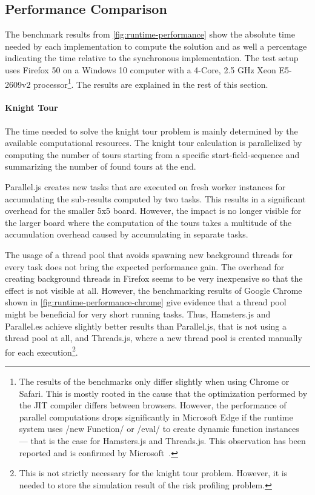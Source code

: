 \subsection{Performance Comparison}
The benchmark results from \cref{fig:runtime-performance} show the absolute time needed by each implementation to compute the solution and as well a percentage indicating the time relative to the synchronous implementation. The test setup uses Firefox 50 on a Windows 10 computer with a 4-Core, 2.5 GHz Xeon E5-2609v2 processor\footnote{The results of the benchmarks only differ slightly when using Chrome or Safari. This is mostly rooted in the cause that the optimization performed by the JIT compiler differs between browsers. However, the performance of parallel computations drops significantly in Microsoft Edge if the runtime system uses \javascriptinline/new Function/ or \javascriptinline/eval/ to create dynamic function instances --- that is the case for Hamsters.js and Threads.js. This observation has been reported and is confirmed by Microsoft~\cite{newFunctionWebWorkerEdge}.}. The results are explained in the rest of this section.

\begin{figure*}
		
	\caption{Runtime Performance of Parallelization Problems Relative to Synchronously Execution}
	\label{fig:runtime-performance}
\end{figure*}


\paragraph{Knight Tour} The time needed to solve the knight tour problem is mainly determined by the available computational resources. The knight tour calculation is parallelized by computing the number of tours starting from a specific start-field-sequence and summarizing the  number of found tours at the end. 

Parallel.js creates new tasks that are executed on fresh worker instances for accumulating the sub-results computed by two tasks. This results in a significant overhead for the smaller 5x5 board. However, the impact is no longer visible for the larger board where the computation of the tours takes a multitude of the accumulation overhead caused by accumulating in separate tasks.

The usage of a thread pool that avoids spawning new background threads for every task does not bring the expected performance gain. The overhead for creating background threads in Firefox seems to be very inexpensive so that the effect is not visible at all. However, the benchmarking results of Google Chrome shown in \cref{fig:runtime-performance-chrome} give evidence that a thread pool might be beneficial for very short running tasks. Thus, Hamsters.js and Parallel.es achieve slightly better results than Parallel.js, that is not using a thread pool at all, and Threads.js, where a new thread pool is created manually for each execution\footnote{This is not strictly necessary for the knight tour problem. However, it is needed to store the simulation result of the risk profiling problem.}. 

